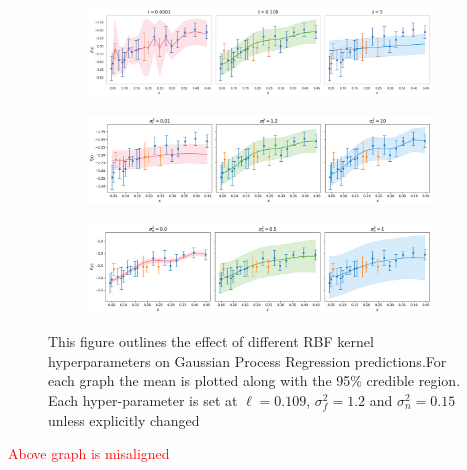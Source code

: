 \documentclass{article}
\begin{document}
\begin{figure}[H]
    \centering

    \begin{subfigure}[b]{0.8\textwidth}
        \centering
        \includegraphics[width=\textwidth]{LatexPlots/1dplots/RBFlengthparam.png}
    \end{subfigure}

    \begin{subfigure}[b]{0.8\textwidth}
        \centering
        \includegraphics[width=\textwidth]{LatexPlots/1dplots/RBFvarparam.png}
    \end{subfigure}

    \begin{subfigure}[b]{0.8\textwidth}
        \centering
        \includegraphics[width=\textwidth]{LatexPlots/1dplots/RBFnoiseparam.png}
    \end{subfigure}

    \caption{This figure outlines the effect of different RBF kernel hyperparameters on Gaussian Process Regression predictions.For each graph the mean is plotted along with the 95\%
    credible region. Each hyper-parameter is set at $\ell=0.109$, $\sigma_f^2 =1.2$ and $\sigma_n^2 = 0.15$ unless explicitly changed}
    \label{figure: Effect of Hyper-parameters}
\end{figure}


\textcolor{red}{ Above graph is misaligned}
\end{document}
